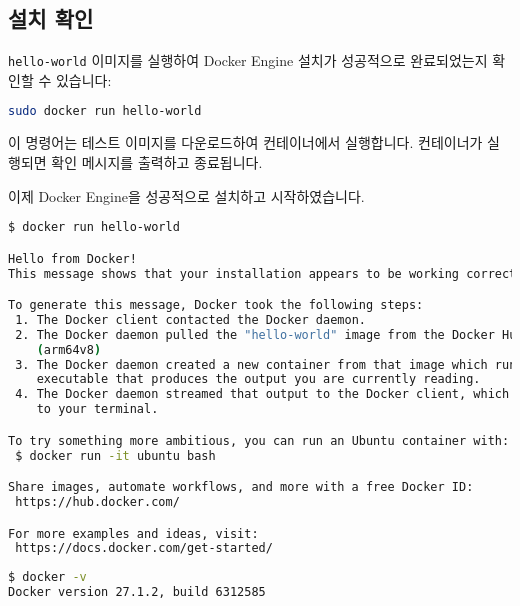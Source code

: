 \subsection{설치 확인}

\texttt{hello-world} 이미지를 실행하여 Docker Engine 설치가 성공적으로 완료되었는지 확인할 수 있습니다:
\begin{lstlisting}[language=bash]
 sudo docker run hello-world
\end{lstlisting}
이 명령어는 테스트 이미지를 다운로드하여 컨테이너에서 실행합니다. 컨테이너가 실행되면 확인 메시지를 출력하고 종료됩니다.

이제 Docker Engine을 성공적으로 설치하고 시작하였습니다.

\begin{lstlisting}[language=bash]
$ docker run hello-world

Hello from Docker!
This message shows that your installation appears to be working correctly.

To generate this message, Docker took the following steps:
 1. The Docker client contacted the Docker daemon.
 2. The Docker daemon pulled the "hello-world" image from the Docker Hub.
    (arm64v8)
 3. The Docker daemon created a new container from that image which runs the
    executable that produces the output you are currently reading.
 4. The Docker daemon streamed that output to the Docker client, which sent it
    to your terminal.

To try something more ambitious, you can run an Ubuntu container with:
 $ docker run -it ubuntu bash

Share images, automate workflows, and more with a free Docker ID:
 https://hub.docker.com/

For more examples and ideas, visit:
 https://docs.docker.com/get-started/

\end{lstlisting}

\begin{lstlisting}[language=bash]
$ docker -v
Docker version 27.1.2, build 6312585
\end{lstlisting}

